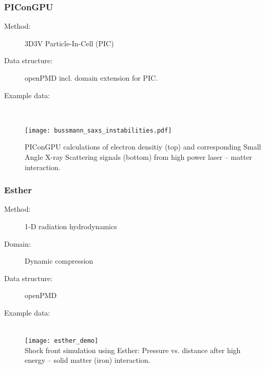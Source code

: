 \documentclass[12pt]{scrartcl}
\begin{document}
\subsubsection{PIConGPU\label{sec:interface_pmi_picongpu}}
\begin{description}
  \item[Method:] 3D3V Particle-In-Cell (PIC)
  \item[Data structure:] openPMD incl. domain extension for PIC.
  \item[Example data:]\ \\
      \begin{center}
        \texttt{[image: bussmann\_saxs\_instabilities.pdf]}
      \end{center}
      \scriptsize{PIConGPU calculations of electron densitiy (top) and
        corresponding Small Angle X-ray Scattering signals (bottom) from high power laser -- matter
    interaction.}
\end{description}
%
\subsubsection{Esther\label{sec:interface_pmi_esther}}
\begin{description}
  \item[Method:] 1-D radiation hydrodynamics
  \item[Domain:] Dynamic compression
  \item[Data structure:] openPMD
  \item[Example data:] \ \\
    \texttt{[image: esther\_demo]}\\
    \scriptsize{Shock front simulation using Esther: Pressure vs. distance after
    high energy -- solid matter (iron) interaction.}
\end{description}

\end{document}
